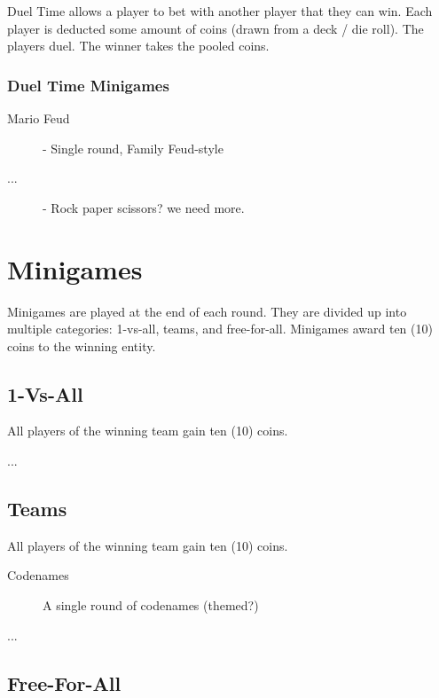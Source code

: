 \documentclass{article}
\begin{document}
Duel Time allows a player to bet with another player that they can win.
Each player is deducted some amount of coins (drawn from a deck / die roll).
The players duel.
The winner takes the pooled coins.

\subsubsection{Duel Time Minigames}

\begin{description}
\item[Mario Feud] - Single round, Family Feud-style
\item[...] - Rock paper scissors? we need more.
\end{description}

\section{Minigames}

Minigames are played at the end of each round.  They are divided up into multiple
categories: 1-vs-all, teams, and free-for-all.  Minigames award ten (10) coins
to the winning entity.

\subsection{1-Vs-All}

All players of the winning team gain ten (10) coins.

\begin{description}
\item[...]
\end{description}

\subsection{Teams}

All players of the winning team gain ten (10) coins.

\begin{description}
\item[Codenames] A single round of codenames (themed?)
\item[...]
\end{description}

\subsection{Free-For-All}
\end{document}
